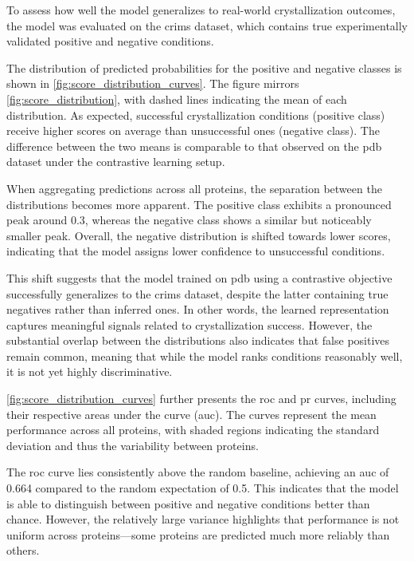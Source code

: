 To assess how well the model generalizes to real-world crystallization outcomes, the model was evaluated on the \gls{crims} dataset, which contains true experimentally validated positive and negative conditions.

The distribution of predicted probabilities for the positive and negative classes is shown in \autoref{fig:score_distribution_curves}. The figure mirrors \autoref{fig:score_distribution}, with dashed lines indicating the mean of each distribution. As expected, successful crystallization conditions (positive class) receive higher scores on average than unsuccessful ones (negative class). The difference between the two means is comparable to that observed on the \gls{pdb} dataset under the contrastive learning setup.

When aggregating predictions across all proteins, the separation between the distributions becomes more apparent. The positive class exhibits a pronounced peak around 0.3, whereas the negative class shows a similar but noticeably smaller peak. Overall, the negative distribution is shifted towards lower scores, indicating that the model assigns lower confidence to unsuccessful conditions. 

This shift suggests that the model trained on \gls{pdb} using a contrastive objective successfully generalizes to the \gls{crims} dataset, despite the latter containing true negatives rather than inferred ones. In other words, the learned representation captures meaningful signals related to crystallization success. However, the substantial overlap between the distributions also indicates that false positives remain common, meaning that while the model ranks conditions reasonably well, it is not yet highly discriminative.

\autoref{fig:score_distribution_curves} further presents the \gls{roc} and \gls{pr} curves, including their respective areas under the curve (\gls{auc}). The curves represent the mean performance across all proteins, with shaded regions indicating the standard deviation and thus the variability between proteins.

The \gls{roc} curve lies consistently above the random baseline, achieving an \gls{auc} of 0.664 compared to the random expectation of 0.5. This indicates that the model is able to distinguish between positive and negative conditions better than chance. However, the relatively large variance highlights that performance is not uniform across proteins—some proteins are predicted much more reliably than others.

